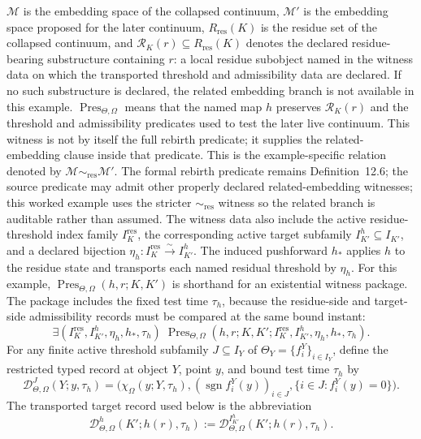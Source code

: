 \(\mathcal{M}\) is the embedding space of the collapsed continuum,
\(\mathcal{M}'\) is the embedding space proposed for the later continuum,
\(R_{\mathrm{res}}(K)\) is the residue set of the collapsed continuum, and
\(\mathcal{R}_K(r)\subseteq R_{\mathrm{res}}(K)\) denotes the declared
residue-bearing substructure containing \(r\): a local residue subobject named
in the witness data on which the transported threshold and admissibility data
are declared. If no such substructure is declared, the related embedding
branch is not available in this example.
\(\operatorname{Pres}_{\Theta,\Omega}\) means that the named map \(h\)
preserves \(\mathcal{R}_K(r)\) and the threshold and admissibility
predicates used to test the later live continuum. This witness is not by
itself the full rebirth predicate; it supplies the related-embedding clause
inside that predicate. This is the
example-specific relation denoted by
\(\mathcal{M}\sim_{\mathrm{res}}\mathcal{M}'\). The formal rebirth predicate
remains Definition~12.6; the source predicate may admit other properly
declared
related-embedding witnesses; this worked example uses the stricter
\(\sim_{\mathrm{res}}\) witness so the related branch is auditable rather than
assumed.
The witness data also include the active residue-threshold index family
\(I_K^{\mathrm{res}}\), the corresponding active target subfamily
\(I_{K'}^{h}\subseteq I_{K'}\), and a declared bijection
\(\eta_h:I_K^{\mathrm{res}}\xrightarrow{\sim}I_{K'}^{h}\). The induced
pushforward \(h_\ast\) applies \(h\) to the residue state and transports each
named residual threshold by \(\eta_h\).
For this example, \(\operatorname{Pres}_{\Theta,\Omega}(h,r;K,K')\) is
shorthand for an existential witness package.  The package includes the fixed
test time \(\tau_h\), because the residue-side and target-side admissibility
records must be compared at the same bound instant:
\[
  \exists(I_K^{\mathrm{res}},I_{K'}^{h},\eta_h,h_\ast,\tau_h)\;
  \operatorname{Pres}_{\Theta,\Omega}
  (h,r;K,K';I_K^{\mathrm{res}},I_{K'}^{h},\eta_h,h_\ast,\tau_h).
\]
For any finite active threshold subfamily \(J\subseteq I_Y\) of
\(\Theta_Y=\{f_i^Y\}_{i\in I_Y}\), define the restricted typed record at
object \(Y\), point \(y\), and bound test time \(\tau_h\) by
\[
  \mathcal{D}^{J}_{\Theta,\Omega}(Y;y,\tau_h)=
  \big(
    \chi_{\Omega}(y;Y,\tau_h),
    (\operatorname{sgn} f_i^Y(y))_{i\in J},
    \{i\in J:f_i^Y(y)=0\}
  \big).
\]
The transported target record used below is the abbreviation
\[
  \mathcal{D}^{h}_{\Theta,\Omega}(K';h(r),\tau_h)
  :=
  \mathcal{D}^{I_{K'}^h}_{\Theta,\Omega}(K';h(r),\tau_h).
\]
